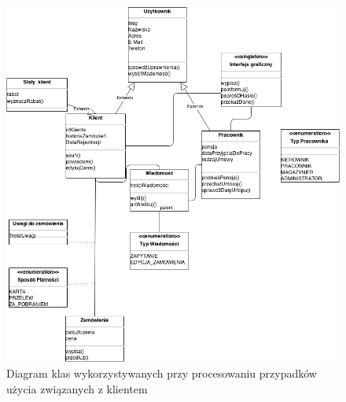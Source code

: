\newpage
\begin{figure}[H]
    \includegraphics[width=\textwidth,
    height=\textheight]{graphics/UseCase/Klient/KlientClassDiagram.png}
  \caption{Diagram klas wykorzystywanych przy procesowaniu przypadków użycia
  związanych z klientem}
\end{figure} 


